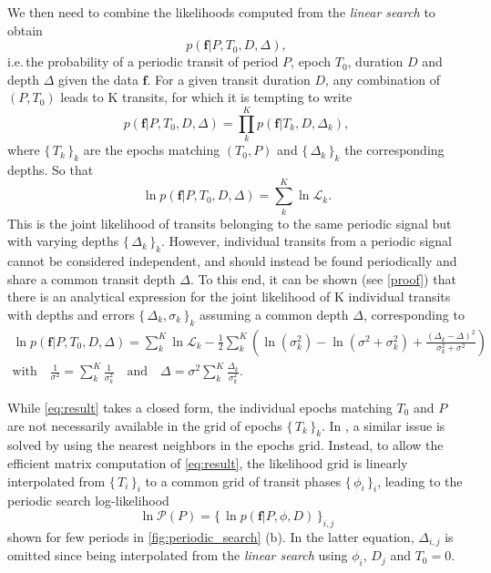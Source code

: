 \documentclass{aastex631}
\newcommand{\set}[1]{\{\,#1\,\}}
\begin{document}
We then need to combine the likelihoods computed from the \textit{linear search} to obtain
\begin{equation*}
    p(\bm{f} \vert P, T_0 , D, \Delta),
\end{equation*}
i.e.\,the probability of a periodic transit of period $P$, epoch $T_0$, duration $D$ and depth $\Delta$ given the data $\bm{f}$. For a given transit duration $D$, any combination of $(P, T_0)$ leads to K transits, for which it is tempting to write
\begin{equation}\label{eq:attempt}
    p(\bm{f} \vert P, T_0 ,D, \Delta) = \prod_k^K p(\bm{f} \vert T_k, D, \Delta_k),
\end{equation}
where $\set{T_k}_k$ are the epochs matching $(T_0, P)$ and $\set{\Delta_k}_k$ the corresponding depths. So that
\begin{equation*}
    \ln p(\bm{f} \vert P, T_0 ,D, \Delta) = \sum_k^K \ln \mathcal{L}_k.
\end{equation*}
This is the joint likelihood of transits belonging to the same periodic signal but with varying depths  $\set{\Delta_k}_k$. However, individual transits from a periodic signal cannot be considered independent, and should instead be found periodically and share a common transit depth $\Delta$. To this end, it can be shown (see \autoref{proof}) that there is an analytical expression for the joint likelihood of K individual transits with depths and errors $\set{\Delta_k, \sigma_k}_k$ assuming a common depth $\Delta$, corresponding to 
\begin{equation}\label{eq:result}
    \begin{gathered}
        \ln p(\bm{f} \vert P, T_0 ,D, \Delta) =  \sum_{k}^K \ln \mathcal{L}_k  - \frac{1}{2} \sum_k^K\left(\ln(\sigma_{k}^2) - \ln(\sigma^{2} + \sigma_{k}^{2}) +  \frac{\left(\Delta_{k} -
        \Delta\right)^{2}}{\sigma_k^{2} + \sigma^{2}}\right) \\
        \text{with} \quad  \frac{1}{\sigma^2} = \sum_k^K \frac{1}{\sigma_k^2} \quad \text{and} \quad
        \Delta = \sigma^2 \sum_k^K {\frac{\Delta_k}{\sigma_k^2}}.
    \end{gathered}
\end{equation}

While \autoref{eq:result} takes a closed form, the individual epochs matching $T_0$ and $P$ are not necessarily available in the grid of epochs $\set{T_k}_k$. In \cite{foreman2016}, a similar issue is solved by using the nearest neighbors in the epochs grid. Instead, to allow the efficient matrix computation of \autoref{eq:result}, the likelihood grid is linearly interpolated from $\set{T_i}_i$ to a common grid of transit phases $\set{\phi_i}_i$, leading to the periodic search log-likelihood
$$\ln\mathcal{P}(P) = \set{\ln p(\bm{f} \vert P, \phi, D)}_{i,j}$$
shown for few periods in \autoref{fig:periodic_search} (b). In the latter equation, $\Delta_{i,j}$ is omitted since being interpolated from the \textit{linear search} using $\phi_i$, $D_j$ and $T_0 = 0$.
\end{document}
